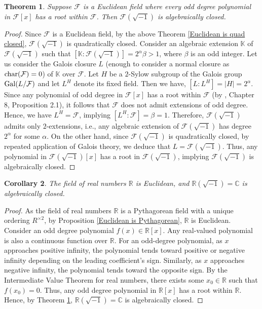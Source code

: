 \documentclass[sn-mathphys-num]{sn-jnl}%
\newtheorem{theorem}{Theorem}[section]
\newtheorem{corollary}[theorem]{Corollary}
\begin{document}
\begin{theorem} \label{main theorem}
  Suppose $\mathcal F$ is a Euclidean field where every odd degree polynomial in $ \mathcal F[x]$ has a root within $\mathcal F$. Then $\mathcal F(\sqrt{-1})$ is algebraically closed. 
\end{theorem}
\begin{proof} 
Since $\mathcal F$ is a Euclidean field, by the above Theorem \ref{Euclidean is quad closed}, $\mathcal F(\sqrt{-1})$ is quadratically closed.
  Consider an algebraic extension $\mathbb K$ of $\mathcal F(\sqrt{-1})$ such that $[\mathbb K:\mathcal F(\sqrt{-1})]=2^\alpha \beta >1$, where $\beta$ is an odd integer.
    Let us consider the Galois closure $L$ (enough to consider a normal closure as ${\rm char}(\mathcal F)=0$) of $\mathbb K$ over $\mathcal F$.
    Let $H$ be a $2$-Sylow subgroup of the Galois group ${\rm Gal}(L/ \mathcal F)$ and let $L^ H$ denote its fixed field. Then we have, $[L:L^ H]=|H|=2^\alpha$. Since any  polynomial of odd degree in $ \mathcal F[x]$ has a root within $\mathcal F$ (by \cite{lam}, Chapter 8, Proposition 2.1), it follows that $\mathcal F$ does not admit extensions of odd degree. Hence, we have $L^ H = \mathcal F$, implying $[L^H:\mathcal F]=\beta = 1$. Therefore, $\mathcal F(\sqrt{-1})$ admits only $2$-extensions, i.e., any algebraic extension of $\mathcal F(\sqrt{-1})$ has degree $2^\alpha$ for some $\alpha$. On the other hand, since $\mathcal F(\sqrt{-1})$ is quadratically closed, by repeated application of Galois theory, we deduce that $L=\mathcal F(\sqrt{-1})$.
    Thus, any polynomial in $\mathcal F(\sqrt{-1})[x]$ has a root in $\mathcal F(\sqrt{-1})$, implying $\mathcal F(\sqrt{-1})$ is algebraically closed.
\end{proof}
\begin{corollary}
    The field of real numbers $\mathbb R$ is Euclidean, and $\mathbb R(\sqrt{-1})=\mathbb C$ is algebraically closed.
\end{corollary}
\begin{proof}
    As the field of real numbers $\mathbb R$ is a Pythagorean field with a unique ordering $R^{\times 2}$, by Proposition \ref{Euclidean is Pythagorean}, $\mathbb R$ is Euclidean. Consider an odd degree polynomial $f(x) \in \mathbb R[x]$. Any real-valued polynomial is also a continuous function over $\mathbb R$. 
    For an odd-degree polynomial, as $x$ approaches positive infinity, the polynomial tends toward positive or negative infinity depending on the leading coefficient's sign. Similarly, as $x$ approaches negative infinity, the polynomial tends toward the opposite sign. By the Intermediate Value Theorem for real numbers, there exists some $x_0 \in \mathbb R$ such that $f(x_0)=0$. Thus, any odd degree polynomial in $\mathbb R[x]$ has a root within $\mathbb R$. Hence, by Theorem \ref{main theorem}, $\mathbb R(\sqrt{-1}) =\mathbb C$ is algebraically closed.
\end{proof}
\medskip 
\end{document}
